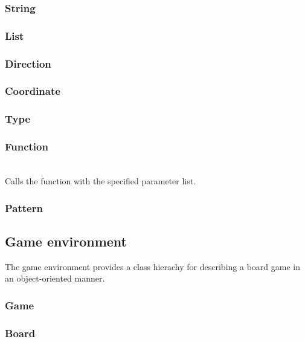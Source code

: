 \subsubsection{String}

\subsubsection{List}

\subsubsection{Direction}

\subsubsection{Coordinate}

\subsubsection{Type}

\subsubsection{Function}

\begin{dlist}
  \item {}\\
    Calls the function with the specified parameter list. 
\end{dlist}

\subsubsection{Pattern}

\subsection{Game environment}

The game environment provides a class hierachy for describing a board game in an object-oriented manner.

\subsubsection{Game}

\subsubsection{Board}

